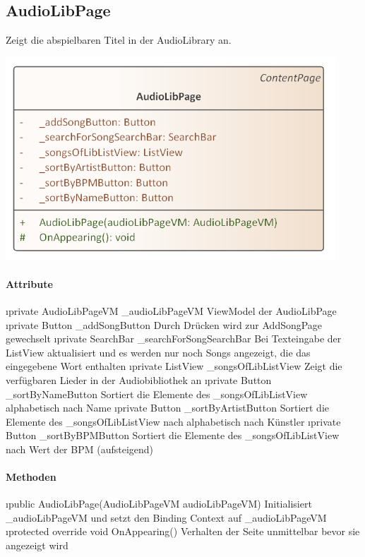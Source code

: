 \documentclass[../entwurf.tex]{subfiles}
\begin{document}
\subsection{AudioLibPage}
Zeigt die abspielbaren Titel in der AudioLibrary an.
\begin{center}
	\includegraphics[page=1,width=350pt,keepaspectratio]{../uml_klassen/View/AudioLibPage.png}
\end{center}
\paragraph{Attribute}
\begin{itemize}
	\i{private AudioLibPageVM \_audioLibPageVM} ViewModel der AudioLibPage
	\i{private Button \_addSongButton} Durch Drücken wird zur AddSongPage gewechselt
	\i{private SearchBar \_searchForSongSearchBar} Bei Texteingabe der ListView aktualisiert und es werden nur noch Songs angezeigt, die das eingegebene Wort enthalten
	\i{private ListView \_songsOfLibListView} Zeigt die verfügbaren Lieder in der Audiobibliothek an
	\i{private Button \_sortByNameButton} Sortiert die Elemente des \_songsOfLibListView alphabetisch nach Name
	\i{private Button \_sortByArtistButton} Sortiert die Elemente des \_songsOfLibListView nach alphabetisch nach Künstler
	\i{private Button \_sortByBPMButton} Sortiert die Elemente des \_songsOfLibListView nach Wert der BPM (aufsteigend)
\end{itemize}

\paragraph{Methoden}
\begin{itemize}
	\i{public AudioLibPage(AudioLibPageVM audioLibPageVM)} Initialisiert \_audioLibPageVM und setzt den Binding Context 			auf \_audioLibPageVM
	\i{protected override void OnAppearing()} Verhalten der Seite unmittelbar bevor sie angezeigt wird
\end{itemize}
\end{document}
